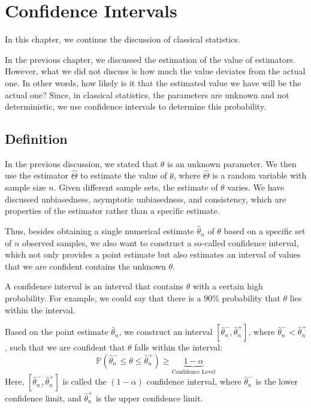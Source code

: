 \chapter{Confidence Intervals}

In this chapter, we continue the discussion of classical statistics.

In the previous chapter, we discussed the estimation of the value of estimators. However, what we did not discuss is how much the value deviates from the actual one. In other words, how likely is it that the estimated value we have will be the actual one? Since, in classical statistics, the parameters are unknown and not deterministic, we use confidence intervals to determine this probability.

\section{Definition}
In the previous discussion, we stated that \(\theta\) is an unknown parameter. We then use the estimator \(\hat{\Theta}\) to estimate the value of \(\theta\), where \(\hat{\Theta}\) is a random variable with sample size \(n\). Given different sample sets, the estimate of \(\theta\) varies. We have discussed unbiasedness, asymptotic unbiasedness, and consistency, which are properties of the estimator rather than a specific estimate.  

Thus, besides obtaining a single numerical estimate \(\hat{\theta}_n\) of \(\theta\) based on a specific set of \(n\) observed samples, we also want to construct a so-called confidence interval, which not only provides a point estimate but also estimates an interval of values that we are confident contains the unknown \(\theta\).  

A confidence interval is an interval that contains \(\theta\) with a certain high probability. For example, we could say that there is a \(90\%\) probability that \(\theta\) lies within the interval.  

Based on the point estimate \(\hat{\theta}_n\), we construct an interval \([\hat{\theta}_n^-, \hat{\theta}_n^+]\), where \(\hat{\theta}_n^- < \hat{\theta}_n^+\), such that we are confident that \(\theta\) falls within the interval:  
\[
  \mathbb{P}(\hat{\theta}_n^- \leq \theta \leq \hat{\theta}_n^+) \geq \underbrace{1 - \alpha}_{\text{Confidence Level}}
\]
Here, \([\hat{\theta}_n^-, \hat{\theta}_n^+]\) is called the \((1 - \alpha)\) confidence interval, where \(\hat{\theta}_n^-\) is the lower confidence limit, and \(\hat{\theta}_n^+\) is the upper confidence limit. 

